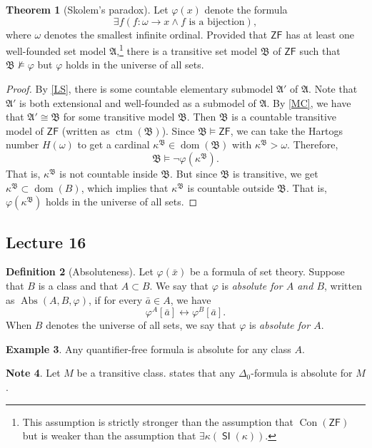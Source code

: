 \documentclass[10pt,letterpaper,cm]{nupset}
\theoremstyle{definition}
\newtheorem{definition}{Definition}[subsection]
\newtheorem{exmp}[definition]{Example}
\newtheorem{note}[definition]{Note}
\theoremstyle{theorem}
\newtheorem{theorem}[definition]{Theorem}
\theoremstyle{remark}
\newcommand{\A}{\mathfrak A}
\newcommand{\B}{\mathfrak{B}}
\newcommand{\1}{\mathbf{1}}
\newcommand{\0}{\vec 0}
\newcommand{\zf}{\mathsf{ZF}}
\DeclareMathOperator{\abs}{Abs}
\DeclareMathOperator{\dom}{dom}
\DeclareMathOperator{\si}{\mathsf{SI}}
\DeclareMathOperator{\con}{Con}
\DeclareMathOperator{\ctm}{ctm}
\begin{document}
\begin{theorem}[Skolem's paradox]
Let $\varphi(x)$ denote the formula $$\exists f(f : \omega  \to  x \land f \text{ is a bijection})  ,  $$ where $\omega$ denotes the smallest infinite ordinal. Provided that $\zf$ has at least one well-founded set model $\A$,\footnote{This assumption is strictly stronger than the assumption that $\con(\zf)$ but is weaker than the assumption that $\exists \kappa(\si(\kappa))$.} there is a transitive set model $\B$ of $\zf$ such that $\B \nvDash \varphi$ but $\varphi$ holds in the universe of all sets.
\end{theorem}
\begin{proof}
By \cref{LS}, there is some countable elementary submodel $\A'$ of $\A$. Note that $\A'$ is both extensional and well-founded as a submodel of $\A$. By \cref{MC}, we have that $\A' \cong \B$ for some transitive model $\B$. Then $\B$ is a countable transitive model of $\zf$ (written as $\ctm(\B)$). Since $\B \models \zf$, we can take the Hartogs number $H(\omega)$ to get a cardinal $\kappa^{\B} \in \dom(\B)$ with $\kappa^{\B} > \omega$. Therefore, $$\B \models \neg{\varphi(\kappa^{\B})}.$$ That is, $\kappa^{\B}$ is not countable inside $\B$. But since $\B$ is transitive, we get $\kappa^{\B} \subset \dom(B)$, which implies that $\kappa^{\B}$ is countable outside $\B$. That is, $\varphi(\kappa^{\B})$ holds in the universe of all sets.
\end{proof}

\subsection{Lecture 16}

\begin{definition}[Absoluteness] Let $\varphi(\bar{x})$ be a formula of set theory. Suppose that $B$ is a class and that $A\subset B$. We say that $\varphi$ is \textit{absolute for $A$ and $B$}, written as $\abs(A,B, \varphi)$, if for every $\bar{a}\in A$, we have $$\varphi^A\left[\bar{a}\right] \leftrightarrow \varphi^B\left[\bar{a}\right].$$ When $B$ denotes the universe of all sets, we say that $\varphi$ is \textit{absolute for $A$}.
\end{definition}

\begin{exmp}
Any quantifier-free formula is  absolute for any class $A$.
\end{exmp}

\begin{note}
Let $M$ be a transitive class.  states that any $\Delta_0$-formula is absolute for $M$.
\end{note}
\end{document}
